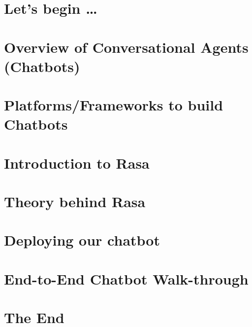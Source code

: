 \section[Start]{Let's begin \ldots}


\section[Overview]{Overview of Conversational Agents (Chatbots)}


\section[Platforms]{Platforms/Frameworks to build Chatbots}



\section[Intro]{Introduction to Rasa}



\section[Theory]{Theory behind Rasa}



% 
% 

% 
% 

\section[Deploy]{Deploying our chatbot}


\section[Zomato]{End-to-End Chatbot Walk-through}


\section[End]{The End}

